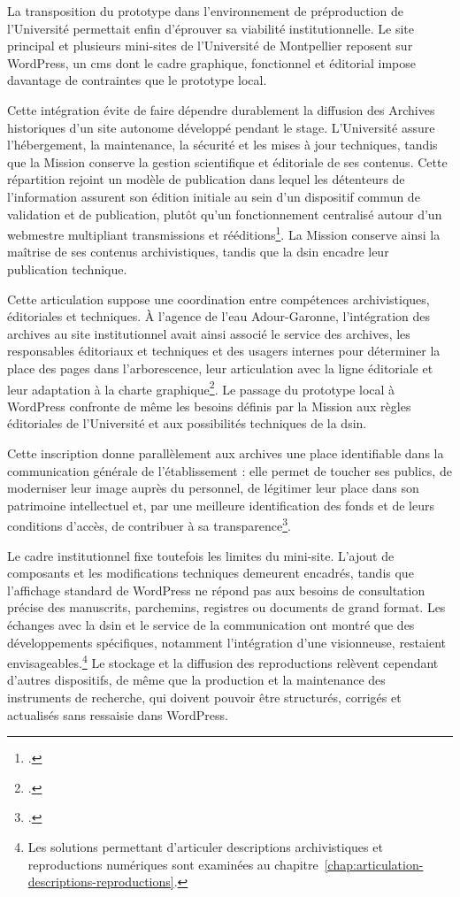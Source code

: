La transposition du prototype dans l'environnement de préproduction de l'Université permettait enfin d'éprouver sa viabilité institutionnelle. Le site principal et plusieurs mini-sites de l'Université de Montpellier reposent sur WordPress, un \gls{cms} dont le cadre graphique, fonctionnel et éditorial impose davantage de contraintes que le prototype local.

Cette intégration évite de faire dépendre durablement la diffusion des Archives historiques d'un site autonome développé pendant le stage. L'Université assure l'hébergement, la maintenance, la sécurité et les mises à jour techniques, tandis que la Mission conserve la gestion scientifique et éditoriale de ses contenus. Cette répartition rejoint un modèle de publication dans lequel les détenteurs de l'information assurent son édition initiale au sein d'un dispositif commun de validation et de publication, plutôt qu'un fonctionnement centralisé autour d'un webmestre multipliant transmissions et rééditions\footcite[pp.~122--124]{Reymond2008Webometrie}. La Mission conserve ainsi la maîtrise de ses contenus archivistiques, tandis que la \gls{dsin} encadre leur publication technique.

Cette articulation suppose une coordination entre compétences archivistiques, éditoriales et techniques. À l'agence de l'eau Adour-Garonne, l'intégration des archives au site institutionnel avait ainsi associé le service des archives, les responsables éditoriaux et techniques et des usagers internes pour déterminer la place des pages dans l'arborescence, leur articulation avec la ligne éditoriale et leur adaptation à la charte graphique\footcite[pp.~92--96]{FerradouFine2011}. Le passage du prototype local à WordPress confronte de même les besoins définis par la Mission aux règles éditoriales de l'Université et aux possibilités techniques de la \gls{dsin}.

Cette inscription donne parallèlement aux archives une place identifiable dans la communication générale de l'établissement : elle permet de toucher ses publics, de moderniser leur image auprès du personnel, de légitimer leur place dans son patrimoine intellectuel et, par une meilleure identification des fonds et de leurs conditions d'accès, de contribuer à sa transparence\footcite[pp.~90--91 et 98--103]{FerradouFine2011}.

Le cadre institutionnel fixe toutefois les limites du mini-site. L'ajout de composants et les modifications techniques demeurent encadrés, tandis que l'affichage standard de WordPress ne répond pas aux besoins de consultation précise des manuscrits, parchemins, registres ou documents de grand format. Les échanges avec la \gls{dsin} et le service de la communication ont montré que des développements spécifiques, notamment l'intégration d'une visionneuse, restaient envisageables.\footnote{Les solutions permettant d'articuler descriptions archivistiques et reproductions numériques sont examinées au chapitre~\ref{chap:articulation-descriptions-reproductions}.} Le stockage et la diffusion des reproductions relèvent cependant d'autres dispositifs, de même que la production et la maintenance des instruments de recherche, qui doivent pouvoir être structurés, corrigés et actualisés sans ressaisie dans WordPress.

